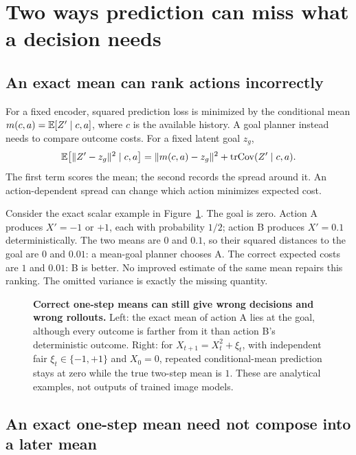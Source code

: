 \section{Two ways prediction can miss what a decision needs}
\label{sec:mechanisms}

\subsection{An exact mean can rank actions incorrectly}
\label{sec:variance-example}

For a fixed encoder, squared prediction loss is minimized by the conditional mean
$m(c,a)=\mathbb{E}[Z'\mid c,a]$, where $c$ is the available history. A goal planner instead needs to compare
outcome costs. For a fixed latent goal $z_g$,
\begin{equation}
\label{eq:variance-cost}
\mathbb{E}\!\left[\|Z'-z_g\|^2\mid c,a\right]
=\|m(c,a)-z_g\|^2+\mathrm{tr}\mathrm{Cov}(Z'\mid c,a).
\end{equation}
The first term scores the mean; the second records the spread around it. An action-dependent spread
can change which action minimizes expected cost.

Consider the exact scalar example in Figure~\ref{fig:concepts}. The goal is zero. Action A produces
$X'=-1$ or $+1$, each with probability $1/2$; action B produces $X'=0.1$ deterministically. The two
means are $0$ and $0.1$, so their squared distances to the goal are $0$ and $0.01$: a mean-goal
planner chooses A. The correct expected costs are $1$ and $0.01$: B is better. No improved estimate
of the same mean repairs this ranking. The omitted variance is exactly the missing quantity.

\begin{figure}[t]
\centering
{}
\caption{\textbf{Correct one-step means can still give wrong decisions and wrong rollouts.}
Left: the exact mean of action A lies at the goal, although every outcome is farther from it than
action B's deterministic outcome. Right: for $X_{t+1}=X_t^2+\xi_t$, with independent fair
$\xi_t\in\{-1,+1\}$ and $X_0=0$, repeated conditional-mean prediction stays at zero while the true
two-step mean is $1$. These are analytical examples, not outputs of trained image models.}
\label{fig:concepts}
\end{figure}

\subsection{An exact one-step mean need not compose into a later mean}
\label{sec:recursive-example}

